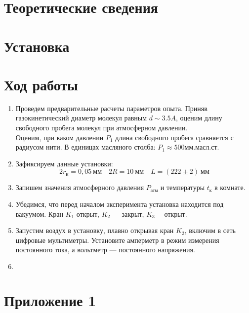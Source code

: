 \documentclass[12pt]{article}
\begin{document}
    \section{Теоретические сведения}  
    
    \section{Установка}
    
    \section{Ход работы}     
        \begin{enumerate}
            \item Проведем предварительные расчеты параметров опыта. Приняв газокинетический диаметр молекул равным $d \sim 3.5 A$, оценим
            длину свободного пробега молекул при атмосферном давлении.\\
            Оценим, при каком давлении $P_1$ длина свободного пробега сравняется с радиусом нити. В единицах масляного столба: $P_1 \approx 500 \text{мм.масл.ст.}$
            \item  Зафиксируем данные установки:
            \[2r_\text{н} = 0,05~\text{мм}\quad 2R = 10~\text{мм} \quad L = (222\pm 2)~\text{мм}\]
            \item Запишем значения атмосферного давления $P_{\text{атм}}$ и температуры $t_{\text{к}}$ в комнате.
            \item Убедимся, что перед началом эксперимента установка находится под вакуумом. Кран $K_1$ открыт, $K_2$ — закрыт, $K_3$— открыт.
            \item Запустим воздух в установку, плавно открывая кран $K_2$, включим в сеть цифровые мультиметры. Установите амперметр в режим
            измерения постоянного тока, а вольтметр — постоянного напряжения.
            \item 
            
                    
        \end{enumerate}

\newpage
\section{Приложение 1}
\end{document}
